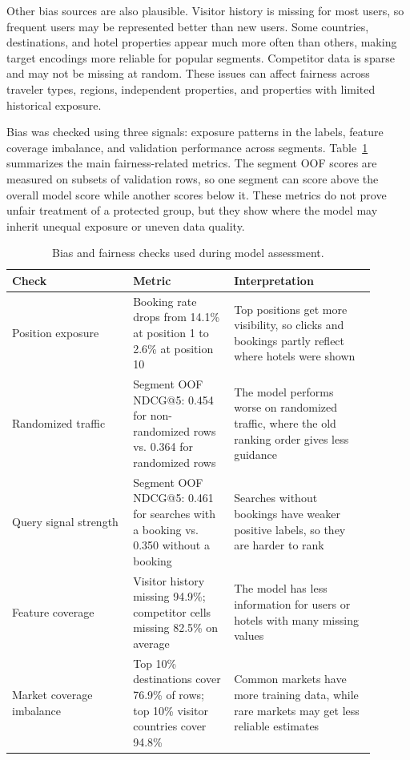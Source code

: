 \documentclass[runningheads]{llncs}
\begin{document}
Other bias sources are also plausible.  Visitor history is missing for most users, so frequent users may be represented better than new users.  Some countries, destinations, and hotel properties appear much more often than others, making target encodings more reliable for popular segments.  Competitor data is sparse and may not be missing at random.  These issues can affect fairness across traveler types, regions, independent properties, and properties with limited historical exposure.

Bias was checked using three signals: exposure patterns in the labels, feature coverage imbalance, and validation performance across segments. Table~\ref{tab:bias-checks} summarizes the main fairness-related metrics. The segment OOF scores are measured on subsets of validation rows, so one segment can score above the overall model score while another scores below it. These metrics do not prove unfair treatment of a protected group, but they show where the model may inherit unequal exposure or uneven data quality.


\begin{table}[t]
\centering
\caption{Bias and fairness checks used during model assessment.}
\label{tab:bias-checks}
\small
\begin{tabular}{@{}>{\raggedright\arraybackslash}p{0.30\linewidth}>{\raggedright\arraybackslash}p{0.25\linewidth}>{\raggedright\arraybackslash}p{0.35\linewidth}@{}}
\toprule
Check & Metric & Interpretation \\
\midrule
Position exposure & Booking rate drops from 14.1\% at position 1 to 2.6\% at position 10 & Top positions get more visibility, so clicks and bookings partly reflect where hotels were shown \\
Randomized traffic & Segment OOF NDCG@5: 0.454 for non-randomized rows vs. 0.364 for randomized rows & The model performs worse on randomized traffic, where the old ranking order gives less guidance \\
Query signal strength & Segment OOF NDCG@5: 0.461 for searches with a booking vs. 0.350 without a booking & Searches without bookings have weaker positive labels, so they are harder to rank \\
Feature coverage & Visitor history missing 94.9\%; competitor cells missing 82.5\% on average & The model has less information for users or hotels with many missing values \\
Market coverage imbalance & Top 10\% destinations cover 76.9\% of rows; top 10\% visitor countries cover 94.8\% & Common markets have more training data, while rare markets may get less reliable estimates \\
\bottomrule
\end{tabular}
\end{table}
\end{document}
